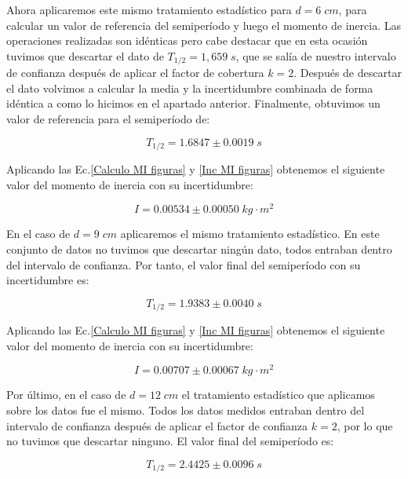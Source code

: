 \documentclass[a4paper,12pt,titlepage]{article}
\begin{document}
Ahora aplicaremos este mismo tratamiento estadístico para $d=6 \; cm$, para calcular un valor de referencia del semiperíodo y luego el momento de inercia. Las operaciones realizadas son idénticas pero cabe destacar que en esta ocasión tuvimos que descartar el dato de $T_{1/2}=1,659 \;s$, que se salía de nuestro intervalo de confianza después de aplicar el factor de cobertura $k=2$. Después de descartar el dato volvimos a calcular la media y la incertidumbre combinada de forma idéntica a como lo hicimos en el apartado anterior. Finalmente, obtuvimos un valor de referencia para el semiperíodo de:

\begin{equation}
    T_{1/2} = 1.6847 \pm 0.0019 \; s
\end{equation}

Aplicando las Ec.\ref{Calculo MI figuras} y \ref{Inc MI figuras} obtenemos el siguiente valor del momento de inercia con su incertidumbre:

\begin{equation}
    I = 0.00534 \pm 0.00050 \; kg \cdot m^2
\end{equation}

En el caso de $d=9 \; cm$ aplicaremos el mismo tratamiento estadístico. En este conjunto de datos no tuvimos que descartar ningún dato, todos entraban dentro del intervalo de confianza. Por tanto, el valor final del semiperíodo con su incertidumbre es:

\begin{equation}
    T_{1/2} = 1.9383 \pm 0.0040 \; s
\end{equation}

Aplicando las Ec.\ref{Calculo MI figuras} y \ref{Inc MI figuras} obtenemos el siguiente valor del momento de inercia con su incertidumbre:

\begin{equation}
    I = 0.00707 \pm 0.00067 \; kg \cdot m^2
\end{equation}

Por último, en el caso de $d=12 \; cm$ el tratamiento estadístico que aplicamos sobre los datos fue el mismo. Todos los datos medidos entraban dentro del intervalo de confianza después de aplicar el factor de confianza $k=2$, por lo que no tuvimos que descartar ninguno. El valor final del semiperíodo es:

\begin{equation}
    T_{1/2} = 2.4425 \pm 0.0096 \; s
\end{equation}
\end{document}
